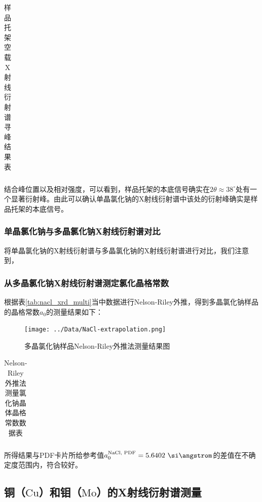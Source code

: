\documentclass{thuemp}
\begin{document}
\begin{table}[H]
    \centering
    \captionnamefont{\wuhao\bf\heiti}
    \captiontitlefont{\wuhao\bf\heiti}
    \caption{样品托架空载X射线衍射谱寻峰结果表}
    \label{tab:nacl_xrd_holder}
    \liuhao
    \begin{tabular}{ccccc}
        \toprule
        \midrule
        \bottomrule
    \end{tabular}
\end{table}

结合峰位置以及相对强度，可以看到，样品托架的本底信号确实在$2\theta \approx 38^\circ$处有一个显著衍射峰。由此可以确认单晶氯化钠的X射线衍射谱中该处的衍射峰确实是样品托架的本底信号。

\subsubsection{单晶氯化钠与多晶氯化钠X射线衍射谱对比}

将单晶氯化钠的X射线衍射谱与多晶氯化钠的X射线衍射谱进行对比，我们注意到，

\subsubsection{从多晶氯化钠X射线衍射谱测定氯化晶格常数}

根据表\ref{tab:nacl_xrd_multi}当中数据进行Nelson-Riley外推，得到多晶氯化钠样品的晶格常数$a_0$的测量结果如下：

\begin{figure}[H]
    \centering
    \texttt{[image: ../Data/NaCl-extrapolation.png]}
    \caption{多晶氯化钠样品Nelson-Riley外推法测量结果图}
    \label{fig:nacl_xrd_extrapol}
\end{figure}

\begin{table}[H]
    \centering
    \captionnamefont{\wuhao\bf\heiti}
    \captiontitlefont{\wuhao\bf\heiti}
    \caption{Nelson-Riley外推法测量氯化钠晶体晶格常数数据表}
    \label{tab:nacl_xrd_extrapol}
    \liuhao
    \begin{tabular}{ccccc}
        \toprule
        \midrule
        \bottomrule
    \end{tabular}
\end{table}

所得结果与PDF卡片所给参考值$a_0^{\text{NaCl, PDF}} = 5.6402~\text{\si\angstrom}$的差值在不确定度范围内，符合较好。

\subsection{铜（$\text{Cu}$）和钼（$\text{Mo}$）的X射线衍射谱测量}
\end{document}
